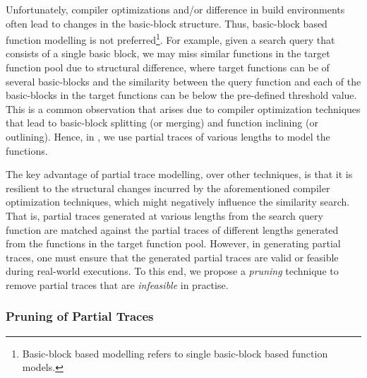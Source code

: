 Unfortunately, compiler optimizations and/or difference in build environments often lead to changes in the basic-block structure. Thus, basic-block based function modelling is not preferred\footnote{Basic-block based modelling refers to single basic-block based function models.}.  For example, given a search query that consists of a single basic block, we may miss similar functions in the target function pool due to structural difference, where target functions can be of several basic-blocks and the similarity between the query function and each of the basic-blocks in the target functions can be below the pre-defined threshold value. This is a common observation that arises due to compiler optimization techniques that lead to basic-block splitting (or merging) and function inclining (or outlining). Hence, in \tool, we use partial traces of various lengths to model the functions. 

The key advantage of partial trace modelling, over other techniques, is that it is resilient to the structural changes incurred by the aforementioned compiler optimization techniques, which might negatively influence the similarity search. That is, partial traces generated at various lengths from the search query function are matched against the partial traces of different lengths generated from the functions in the target function pool. However, in generating partial traces, one must ensure that the generated partial traces are valid or feasible during real-world executions. To this end, we propose a \textit{pruning} technique to remove partial traces that are \textit{infeasible} in practise. %

\subsubsection{Pruning of Partial Traces} \label{subsubsec:sou_prun}



